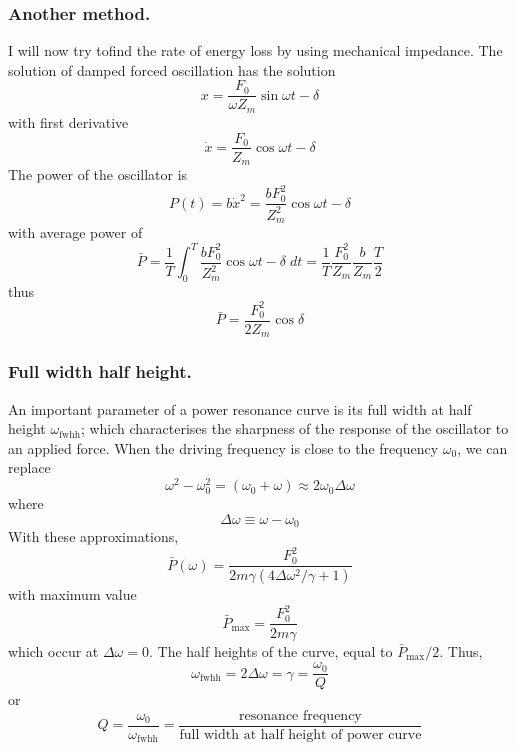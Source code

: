 \documentclass[../../../main.tex]{subfiles}
\begin{document}
\subsubsection{Another method.} I will now try tofind the rate of energy loss by using mechanical impedance. The solution of damped forced oscillation has the solution
\begin{equation*}
    x=\frac{F_0 }{\omega Z_m}\sin \omega t-\delta
\end{equation*}
with first derivative
\begin{equation*}
    \dot{x}=\frac{F_0}{Z_m}\cos  \omega t-\delta
\end{equation*}
The power of the oscillator is
\begin{equation*}
    P(t)=b\dot{x}^2=\frac{b F_0^2}{Z_m^2}\cos  \omega t-\delta
\end{equation*}
with average power of
\begin{equation*}
    \bar{P}=\frac{1}{T}\int_{0}^{T} \frac{b F_0^2}{Z_m^2}\cos  \omega t-\delta \; dt=\frac{1}{T}\frac{F_0^2}{Z_m} \frac{b}{Z_m} \frac{T}{2}
\end{equation*}
thus
\begin{equation*}
    \bar{P}=\frac{F_0^2}{2Z_m}\cos \delta
\end{equation*}


\subsubsection{Full width half height.} An important parameter of a power resonance curve is its full width at half height $\omega_\text{fwhh}$; which characterises the sharpness of the response of the oscillator to an applied force. When the driving frequency is close to the frequency $\omega_0$, we can replace
\begin{equation*}
    \omega^2-\omega_0^2=(\omega_0+\omega)\approx 2\omega_0 \Delta \omega
\end{equation*}
where
\begin{equation*}
    \Delta \omega \equiv \omega -\omega_0
\end{equation*}
With these approximations, 
\begin{equation*}
    \bar{P} (\omega)=\frac{F_0^2}{2m\gamma(4\Delta\omega^2/\gamma+1)}
\end{equation*}
with maximum value
\begin{equation*}
    \bar{P}_{\text{max}}=\frac{F_0^2}{2m\gamma}
\end{equation*}
which occur at $\Delta\omega=0$. The half heights of the curve, equal to $\bar{P}_{\text{max}}/2$. Thus,
\begin{equation*}
    \omega_\text{fwhh}=2\Delta\omega=\gamma=\frac{\omega_0}{Q}
\end{equation*}
or 
\begin{equation*}
    Q=\frac{\omega_0}{\omega_\text{fwhh}}=\frac{\text{resonance frequency}}{\text{full width at half height of power curve}}
\end{equation*}
\end{document}
